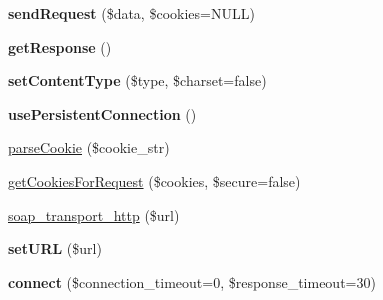 \begin{DoxyCompactItemize}
\item 
\hypertarget{classsoap__transport__http_a58f0210b24415cdc753d31b425a406be}{{\bfseries send\-Request} (\$data, \$cookies=N\-U\-L\-L)}\label{classsoap__transport__http_a58f0210b24415cdc753d31b425a406be}

\item 
\hypertarget{classsoap__transport__http_a6c907e8af775e517a77037dd0164222f}{{\bfseries get\-Response} ()}\label{classsoap__transport__http_a6c907e8af775e517a77037dd0164222f}

\item 
\hypertarget{classsoap__transport__http_a1d16955b48732c7b979b7d2ccaea34c8}{{\bfseries set\-Content\-Type} (\$type, \$charset=false)}\label{classsoap__transport__http_a1d16955b48732c7b979b7d2ccaea34c8}

\item 
\hypertarget{classsoap__transport__http_a8ae21fdc1993b8741956e86fc58c12b1}{{\bfseries use\-Persistent\-Connection} ()}\label{classsoap__transport__http_a8ae21fdc1993b8741956e86fc58c12b1}

\item 
\hyperlink{classsoap__transport__http_ae8e635ed6f4df1ef3f9329f1103b6941}{parse\-Cookie} (\$cookie\-\_\-str)
\item 
\hyperlink{classsoap__transport__http_a51e28e678d231bebb7de006262c31887}{get\-Cookies\-For\-Request} (\$cookies, \$secure=false)
\item 
\hyperlink{classsoap__transport__http_afcc6a2b2fc19a97a2e192670fc8feb77}{soap\-\_\-transport\-\_\-http} (\$url)
\item 
\hypertarget{classsoap__transport__http_a5a4415db7a7e36f85a4d975c892b0470}{{\bfseries set\-U\-R\-L} (\$url)}\label{classsoap__transport__http_a5a4415db7a7e36f85a4d975c892b0470}

\item 
\hypertarget{classsoap__transport__http_a8648865ea5c701e29c03c79af40a7ffc}{{\bfseries connect} (\$connection\-\_\-timeout=0, \$response\-\_\-timeout=30)}\label{classsoap__transport__http_a8648865ea5c701e29c03c79af40a7ffc}


\end{DoxyCompactItemize}
